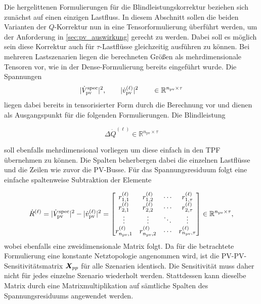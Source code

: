 Die hergelittenen Formulierungen für die Blindleistungskorrektur beziehen sich zunächst auf einen einzigen Lastfluss.
In diesem Abschnitt sollen die beiden Varianten der $Q$-Korrektur nun in eine Tensorformulierung überführt werden, um der Anforderung in  \cref{sec:pv_auswirkung} gerecht zu werden.
Dabei soll es möglich sein diese Korrektur auch für $\tau$-Lastflüsse gleichzeitig ausführen zu können.
Bei mehreren Lastszenarien liegen die berechneten Größen als mehrdimensionale Tensoren vor, wie in der Dense-Formulierung bereits eingeführt wurde.
Die Spannungen 
\begin{equation}
	|\dot{{V}}_{\mathrm{pv}}^{\mathrm{spec}}|^2,
	\qquad
	|\dot{{v}}_{\mathrm{pv}}^{(\ell)}|^2
	\qquad \in
	\mathbb{R}^{n_{\mathrm{pv}}\times\tau}
	\label{eq:dense_pv_voltage}
\end{equation}
liegen dabei bereits in tensorisierter Form durch die Berechnung vor und dienen als Ausgangspunkt für die folgenden Formulierungen.
Die Blindleistung

\begin{equation}
	\Delta\dot{{Q}}^{(\ell)}
	\in
	\mathbb{R}^{n_{\mathrm{pv}}\times\tau}
	\label{eq:dense_dQ}
\end{equation}

soll ebenfalls mehrdimensional vorliegen um diese einfach in den TPF übernehmen zu können.
Die Spalten beherbergen dabei die einzelnen Lastflüsse und die Zeilen wie zuvor die PV-Busse.
Für das Spannungsresiduum folgt eine einfache spaltenweise Subtraktion der Elemente

\begin{equation}
	\dot{{R}}^{(\ell)}
	=
	|\dot{{V}}_{\mathrm{pv}}^{\mathrm{spec}}|^2
	-
	|\dot{{v}}_{\mathrm{pv}}^{(\ell)}|^2
	=
	\begin{bmatrix}
		r_{1,1}^{(\ell)} & r_{1,2}^{(\ell)} & \cdots & r_{1,\tau}^{(\ell)}\\
		r_{2,1}^{(\ell)} & r_{2,2}^{(\ell)} & \cdots & r_{2,\tau}^{(\ell)}\\
		\vdots & \vdots & \ddots & \vdots\\
		r_{n_{\mathrm{pv}},1}^{(\ell)}
		&
		r_{n_{\mathrm{pv}},2}^{(\ell)}
		&
		\cdots
		&
		r_{n_{\mathrm{pv}},\tau}^{(\ell)}
	\end{bmatrix}
	\in
	\mathbb{R}^{n_{\mathrm{pv}}\times\tau},
	\label{eq:dense_pv_residual}
\end{equation}
wobei ebenfalls eine zweidimensionale Matrix folgt.
Da für die betrachtete Formulierung eine konstante Netztopologie
angenommen wird, ist die PV-PV-Sensitivitätsmatrix $\boldsymbol{X}_{pp}$
für alle Szenarien identisch. Die Sensitivität muss daher nicht für jedes
einzelne Szenario wiederholt werden. Stattdessen kann dieselbe Matrix durch
eine Matrixmultiplikation auf sämtliche Spalten des Spannungsresiduums
angewendet werden.\\


